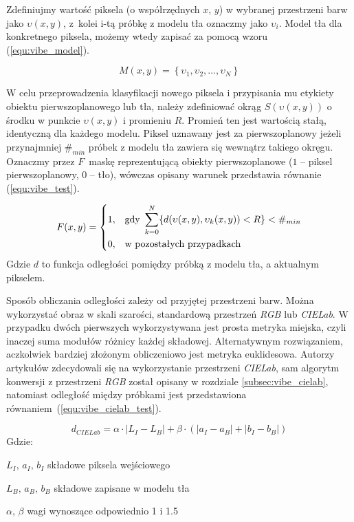 Zdefiniujmy wartość piksela (o współrzędnych $x$, $y$) w wybranej przestrzeni barw jako $\upsilon(x,y)$, z~kolei i-tą próbkę z modelu tła oznaczmy jako $\upsilon_i$. Model tła dla konkretnego piksela, możemy wtedy zapisać za pomocą wzoru (\ref{equ:vibe_model}).

	\begin{equation}
		M(x,y)= \left\{ \upsilon_1, \upsilon_2, \dotsc, \upsilon_N \right\}
	\label{equ:vibe_model}	
	\end{equation}
	
W celu przeprowadzenia klasyfikacji nowego piksela i przypisania mu etykiety obiektu pierwszoplanowego lub tła, należy zdefiniować okrąg $S(\upsilon(x,y))$ o środku w punkcie $\upsilon(x,y)$ i promieniu $R$. Promień ten jest wartością stałą, identyczną dla każdego modelu. Piksel uznawany jest za pierwszoplanowy jeżeli przynajmniej $\#_{min}$ próbek z modelu tła zawiera się wewnątrz takiego okręgu. Oznaczmy przez $F$~maskę reprezentującą obiekty pierwszoplanowe ($1$ -- piksel pierwszoplanowy, $0$ -- tło), wówczas opisany warunek przedstawia równanie (\ref{equ:vibe_test}).

	\begin{equation}
	    F(x,y) = 
		\begin{dcases}
    		1, & \text{gdy } \sum_{k=0}^{N} \{ d(\upsilon(x,y), \upsilon_k(x,y)) < R \} < \#_{min} \\
    		0, & \text{w pozostałych przypadkach} 
		\end{dcases}
	\label{equ:vibe_test}	
	\end{equation}
\noindent Gdzie $d$ to funkcja odległości pomiędzy próbką z modelu tła, a aktualnym pikselem.

Sposób obliczania odległości zależy od przyjętej przestrzeni barw. Można wykorzystać obraz w skali szarości, standardową przestrzeń \textit{RGB} lub \textit{CIELab}. W przypadku dwóch pierwszych wykorzystywana jest prosta metryka miejska, czyli inaczej suma modułów różnicy każdej składowej. Alternatywnym rozwiązaniem, aczkolwiek bardziej złożonym obliczeniowo jest metryka euklidesowa. Autorzy artykułów \cite{kryjak_13_vibe, kryjak_14_vibe} zdecydowali się na wykorzystanie przestrzeni \textit{CIELab}, sam algorytm konwersji z przestrzeni \textit{RGB} został opisany w rozdziale \ref{subsec:vibe_cielab}, natomiast odległość między próbkami jest przedstawiona równaniem~(\ref{equ:vibe_cielab_test}).

	\begin{equation}
	    d_{CIELab} = \alpha \cdot |L_I - L_B| + \beta \cdot (| a_I - a_B | + | b_I - b_B |)
	\label{equ:vibe_cielab_test}
	\end{equation}
Gdzie:
\begin{eqwhere}[2.6cm]
	\item[$L_I,\, a_I,\, b_I$] składowe piksela wejściowego
	\item[$L_B,\, a_B,\, b_B$] składowe zapisane w modelu tła
	\item[$\alpha,\, \beta$] wagi wynoszące odpowiednio \num{1} i \num{1.5}
\end{eqwhere}



